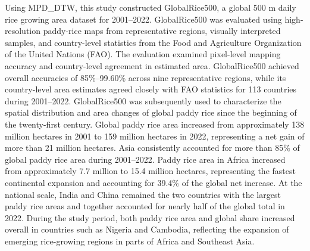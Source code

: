 Using MPD\_DTW, this study constructed GlobalRice500, a global 500 m daily rice growing area dataset for 2001--2022.
GlobalRice500 was evaluated using high-resolution paddy-rice maps from representative regions, visually interpreted samples, and country-level statistics from the Food and Agriculture Organization of the United Nations (FAO). The evaluation examined pixel-level mapping accuracy and country-level agreement in estimated area. GlobalRice500 achieved overall accuracies of 85\%--99.60\% across nine representative regions, while its country-level area estimates agreed closely with FAO statistics for 113 countries during 2001–2022. %
GlobalRice500 was subsequently used to characterize the spatial distribution and area changes of global paddy rice since the beginning of the twenty-first century. 
Global paddy rice area increased from approximately 138 million hectares in 2001 to 159 million hectares in 2022, representing a net gain of more than 21 million hectares.
Asia consistently accounted for more than 85\% of global paddy rice area during 2001–2022. Paddy rice area in Africa increased from approximately 7.7 million to 15.4 million hectares, representing the fastest continental expansion and accounting for 39.4\% of the global net increase.
At the national scale, India and China remained the two countries with the largest paddy rice areas and together accounted for nearly half of the global total in 2022. During the study period, both paddy rice area and global share increased overall in countries such as Nigeria and Cambodia, reflecting the expansion of emerging rice-growing regions in parts of Africa and Southeast Asia.

